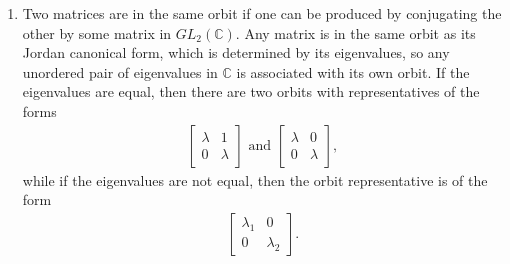 \documentclass[a4paper,12pt]{article}
\begin{document}
\begin{enumerate}
\begin{enumerate}
            \item
                Two matrices are in the same orbit if one can be produced by conjugating the other by some matrix in $GL_2(\mathbb{C})$. Any matrix is in the same orbit as its Jordan canonical form, which is determined by its eigenvalues, so any unordered pair of eigenvalues in $\mathbb{C}$ is associated with its own orbit. If the eigenvalues are equal, then there are two orbits with representatives of the forms
                \begin{align*}
                    \left[ \begin{array}{cc}
                            \lambda & 1 \\
                            0 & \lambda
                    \end{array} \right]
                    \text{ and }
                    \left[ \begin{array}{cc}
                            \lambda & 0 \\
                            0 & \lambda
                    \end{array} \right],
                \end{align*}
                while if the eigenvalues are not equal, then the orbit representative is of the form
                \begin{align*}
                    \left[ \begin{array}{cc}
                            \lambda_1 & 0 \\
                            0 & \lambda_2
                    \end{array} \right].
                \end{align*}
        \end{enumerate}
\end{enumerate}
\end{document}
